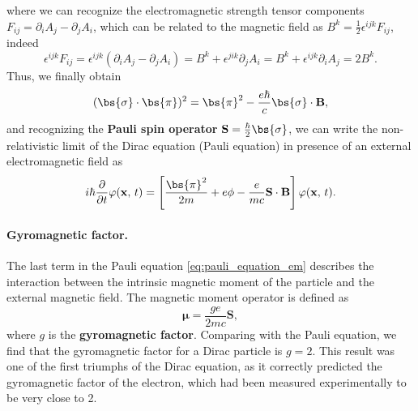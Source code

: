 where we can recognize the electromagnetic strength tensor components \(F_{ij} = \partial_i A_j - \partial_j A_i\), which can be related to the magnetic field as \(B^k = \frac{1}{2} \epsilon^{ijk} F_{ij}\), indeed
\[
    \epsilon^{ijk} F_{ij} = \epsilon^{ijk} (\partial_i A_j - \partial_j A_i) = B^k + \epsilon^{jik} \partial_j A_i = B^k + \epsilon^{ijk} \partial_i A_j = 2 B^k.
\]
Thus, we finally obtain
\[
    (\bs{\sigma}\cdot \bs{\pi})^2 = \bs{\pi}^2 - \frac{e \hbar}{c} \bs{\sigma} \cdot \mathbf{B},
\]
and recognizing the \textbf{Pauli spin operator} \(\mathbf{S} = \frac{\hbar}{2} \bs{\sigma}\), we can write the non-relativistic limit of the Dirac equation (Pauli equation) in presence of an external electromagnetic field as
\begin{equation}
    i \hbar \frac{\partial}{\partial t} \varphi(\mathbf{x},\,t) = \left[\frac{\bs{\pi}^2}{2 m} + e \phi - \frac{e}{m c} \mathbf{S} \cdot \mathbf{B}\right] \varphi(\mathbf{x},\,t).
    \label{eq:pauli_equation_em}
\end{equation}

\paragraph{Gyromagnetic factor.}
The last term in the Pauli equation \eqref{eq:pauli_equation_em} describes the interaction between the intrinsic magnetic moment of the particle and the external magnetic field. The magnetic moment operator is defined as
\[
    \boldsymbol{\mu} = \frac{g e}{2 m c} \mathbf{S},
\]
where \(g\) is the \textbf{gyromagnetic factor}. Comparing with the Pauli equation, we find that the gyromagnetic factor for a Dirac particle is \(g = 2\). This result was one of the first triumphs of the Dirac equation, as it correctly predicted the gyromagnetic factor of the electron, which had been measured experimentally to be very close to 2.

